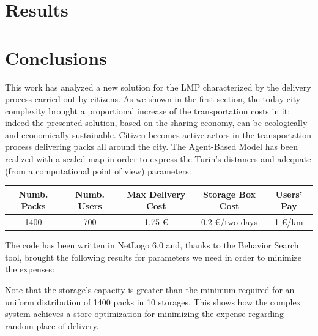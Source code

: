 \documentclass[11pt,a4paper]{article}
\begin{document}

\newpage
\section{Results}

\newpage
\section{Conclusions}
This work has analyzed a new solution for the LMP characterized by the delivery process carried out by citizens. As we shown in the first section, the today city complexity brought a proportional increase of the transportation costs in it; indeed the presented solution, based on the sharing economy, can be ecologically and economically sustainable. Citizen becomes active actors in the transportation process delivering packs all around the city. The Agent-Based Model has been realized with a scaled map in order to express the Turin's distances and adequate (from a computational point of view) parameters:
\begin{center}
  \begin{tabular}{c|c|c|c|c}
    \hline
    Numb. Packs & Numb. Users & Max Delivery Cost & Storage Box Cost & Users' Pay \\
    \hline
    \hline
    1400 & 700 & 1.75 \euro{} & 0.2 \euro{}/two days & 1 \euro{}/km \\
    \hline
  \end{tabular}
\end{center}
The code has been written in NetLogo 6.0 and, thanks to the Behavior Search tool, brought the following results for parameters we need in order to minimize the expenses:
\begin{center}
\end{center}
Note that the storage's capacity is greater than the minimum required for an uniform distribution of 1400 packs in 10 storages. This shows how the complex system achieves a store optimization for minimizing the expense regarding random place of delivery.
\bigskip
\end{document}
